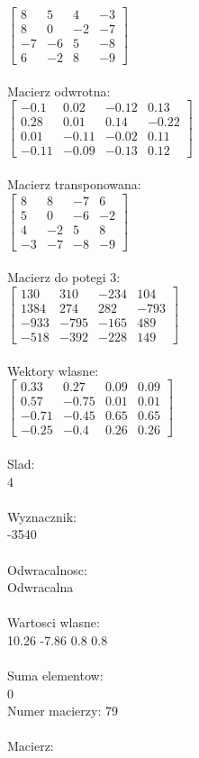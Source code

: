 \documentclass[a4paper,12pt]{article}
\begin{document}
$\begin{bmatrix} 8&5&4&-3\\8&0&-2&-7\\-7&-6&5&-8\\6&-2&8&-9 \end{bmatrix}$
\\
\\
Macierz odwrotna:\\

$\begin{bmatrix} -0.1&0.02&-0.12&0.13\\0.28&0.01&0.14&-0.22\\0.01&-0.11&-0.02&0.11\\-0.11&-0.09&-0.13&0.12 \end{bmatrix}$
\\
\\
Macierz transponowana:\\

$\begin{bmatrix} 8&8&-7&6\\5&0&-6&-2\\4&-2&5&8\\-3&-7&-8&-9 \end{bmatrix}$
\\
\\
Macierz do potegi 3:\\

$\begin{bmatrix} 130&310&-234&104\\1384&274&282&-793\\-933&-795&-165&489\\-518&-392&-228&149 \end{bmatrix}$
\\
\\
Wektory wlasne:\\

$\begin{bmatrix} 0.33&0.27&0.09&0.09\\0.57&-0.75&0.01&0.01\\-0.71&-0.45&0.65&0.65\\-0.25&-0.4&0.26&0.26 \end{bmatrix}$
\\
\\
Slad:\\
4
\\
\\
Wyznacznik:\\
-3540
\\
\\
Odwracalnosc:\\
Odwracalna
\\
\\
Wartosci wlasne:\\
10.26 -7.86 0.8 0.8
\\
\\
Suma elementow:\\
0
\\
\newpage
Numer macierzy:
79
\\
\\
Macierz:\\
\end{document}
